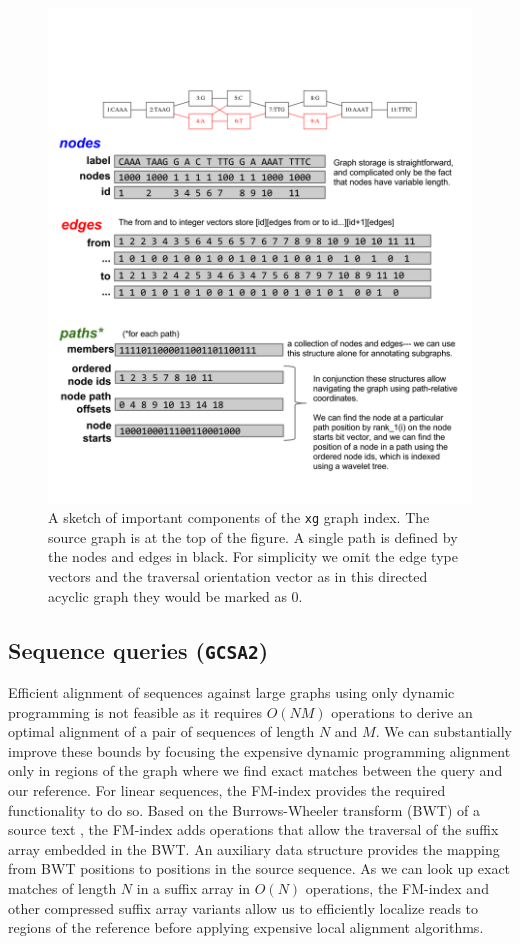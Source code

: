 \documentclass{article}
\begin{document}
\begin{figure}[t]
\centering
\includegraphics[width=1.0\textwidth]{figures/xg}
\caption{\label{fig:xg}
  A sketch of important components of the {\tt xg} graph index.
  The source graph is at the top of the figure.
  A single path is defined by the nodes and edges in black.
  For simplicity we omit the edge type vectors and the traversal orientation vector as in this directed acyclic graph they would be marked as 0.
}
\end{figure}


\subsection{Sequence queries ({\tt GCSA2})}

Efficient alignment of sequences against large graphs using only dynamic programming is not feasible as it requires $O(NM)$ operations to derive an optimal alignment of a pair of sequences of length $N$ and $M$.
We can substantially improve these bounds by focusing the expensive dynamic programming alignment only in regions of the graph where we find exact matches between the query and our reference.
For linear sequences, the FM-index \cite{fmindex2000, fmindex2005} provides the required functionality to do so.
Based on the Burrows-Wheeler transform (BWT) of a source text \cite{burrowswheeler1994}, the FM-index adds operations that allow the traversal of the suffix array embedded in the BWT.
An auxiliary data structure provides the mapping from BWT positions to positions in the source sequence.
As we can look up exact matches of length $N$ in a suffix array in $O(N)$ operations, the FM-index and other compressed suffix array variants allow us to efficiently localize reads to regions of the reference before applying expensive local alignment algorithms.
\end{document}

